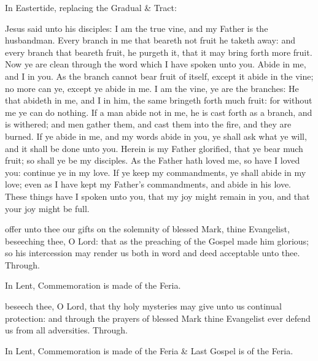 
\begin{rubric}
{In Eastertide, replacing the Gradual \& Tract:}
\end{rubric}\par\noindent


 Jesus said unto his disciples: I am the true vine, and my Father is the husbandman. Every branch in me that beareth not fruit he taketh away: and every branch that beareth fruit, he purgeth it, that it may bring forth more fruit. Now ye are clean through the word which I have spoken unto you. Abide in me, and I in you. As the branch cannot bear fruit of itself, except it abide in the vine; no more can ye, except ye abide in me. I am the vine, ye are the branches: He that abideth in me, and I in him, the same bringeth forth much fruit: for without me ye can do nothing. If a man abide not in me, he is cast forth as a branch, and is withered; and men gather them, and cast them into the fire, and they are burned. If ye abide in me, and my words abide in you, ye shall ask what ye will, and it shall be done unto you. Herein is my Father glorified, that ye bear much fruit; so shall ye be my disciples. As the Father hath loved me, so have I loved you: continue ye in my love. If ye keep my commandments, ye shall abide in my love; even as I have kept my Father's commandments, and abide in his love. These things have I spoken unto you, that my joy might remain in you, and that your joy might be full.

\secret
{} offer unto thee our gifts on the solemnity of blessed Mark, thine Evangelist, beseeching thee, O Lord: that as the preaching of the Gospel made him glorious; so his intercession may render us both in word and deed acceptable unto thee. Through.
\begin{rubric}
    In Lent, Commemoration is made of the Feria.%
\end{rubric}
\postcommunion
{} beseech thee, O Lord, that thy holy mysteries may give unto us continual protection: and through the prayers of blessed Mark thine Evangelist ever defend us from all adversities. Through.
\begin{rubric}
    In Lent, Commemoration is made of the Feria \& Last Gospel is of the Feria.
\end{rubric}


